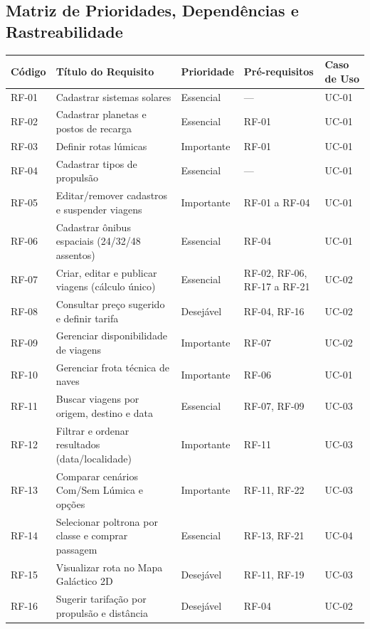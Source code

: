 \documentclass[12pt, a4paper]{article}
\begin{document}
\subsection{Matriz de Prioridades, Dependências e Rastreabilidade}
\begin{table}[H]
\centering
\footnotesize
\setlength{\tabcolsep}{4pt}
\renewcommand{\arraystretch}{1.08}
\begin{tabularx}{\textwidth}{l >{\raggedright\arraybackslash}X l l l}
\toprule
\textbf{Código} & \textbf{Título do Requisito} & \textbf{Prioridade} & \textbf{Pré-requisitos} & \textbf{Caso de Uso} \\
\midrule
RF-01 & Cadastrar sistemas solares & Essencial & --- & UC-01 \\
RF-02 & Cadastrar planetas e postos de recarga & Essencial & RF-01 & UC-01 \\
RF-03 & Definir rotas lúmicas & Importante & RF-01 & UC-01 \\
RF-04 & Cadastrar tipos de propulsão & Essencial & --- & UC-01 \\
RF-05 & Editar/remover cadastros e suspender viagens & Importante & RF-01 a RF-04 & UC-01 \\
RF-06 & Cadastrar ônibus espaciais (24/32/48 assentos) & Essencial & RF-04 & UC-01 \\
RF-07 & Criar, editar e publicar viagens (cálculo único) & Essencial & RF-02, RF-06, RF-17 a RF-21 & UC-02 \\
RF-08 & Consultar preço sugerido e definir tarifa & Desejável & RF-04, RF-16 & UC-02 \\
RF-09 & Gerenciar disponibilidade de viagens & Importante & RF-07 & UC-02 \\
RF-10 & Gerenciar frota técnica de naves & Importante & RF-06 & UC-01 \\
RF-11 & Buscar viagens por origem, destino e data & Essencial & RF-07, RF-09 & UC-03 \\
RF-12 & Filtrar e ordenar resultados (data/localidade) & Importante & RF-11 & UC-03 \\
RF-13 & Comparar cenários Com/Sem Lúmica e opções & Importante & RF-11, RF-22 & UC-03 \\
RF-14 & Selecionar poltrona por classe e comprar passagem & Essencial & RF-13, RF-21 & UC-04 \\
RF-15 & Visualizar rota no Mapa Galáctico 2D & Desejável & RF-11, RF-19 & UC-03 \\
RF-16 & Sugerir tarifação por propulsão e distância & Desejável & RF-04 & UC-02 \\

\end{tabularx}
\end{table}
\end{document}
